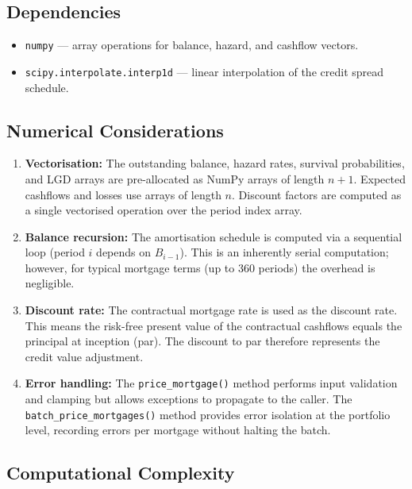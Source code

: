 \documentclass[11pt,a4paper]{article}
\begin{document}
\subsection{Dependencies}

\begin{itemize}[nosep]
    \item \texttt{numpy} --- array operations for balance, hazard, and cashflow vectors.
    \item \texttt{scipy.interpolate.interp1d} --- linear interpolation of the credit
          spread schedule.
\end{itemize}

\subsection{Numerical Considerations}

\begin{enumerate}[nosep]
    \item \textbf{Vectorisation:} The outstanding balance, hazard rates, survival
          probabilities, and LGD arrays are pre-allocated as NumPy arrays of length
          $n+1$. Expected cashflows and losses use arrays of length $n$. Discount
          factors are computed as a single vectorised operation over the period index
          array.
    \item \textbf{Balance recursion:} The amortisation schedule is computed via a
          sequential loop (period $i$ depends on $B_{i-1}$). This is an inherently
          serial computation; however, for typical mortgage terms (up to 360 periods)
          the overhead is negligible.
    \item \textbf{Discount rate:} The contractual mortgage rate is used as the discount
          rate. This means the risk-free present value of the contractual cashflows
          equals the principal at inception (par). The discount to par therefore
          represents the credit value adjustment.
    \item \textbf{Error handling:} The \texttt{price\_mortgage()} method performs input
          validation and clamping but allows exceptions to propagate to the caller.
          The \texttt{batch\_price\_mortgages()} method provides error isolation at the
          portfolio level, recording errors per mortgage without halting the batch.
\end{enumerate}

\subsection{Computational Complexity}
\end{document}
